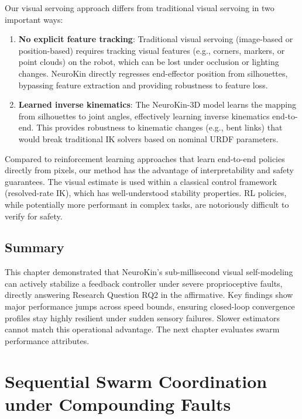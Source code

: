 \documentclass[12pt,a4paper,oneside]{report}
\begin{document}
Our visual servoing approach differs from traditional visual servoing in two important ways:
\begin{enumerate}
    \item \textbf{No explicit feature tracking}: Traditional visual servoing (image-based or position-based) requires tracking visual features (e.g., corners, markers, or point clouds) on the robot, which can be lost under occlusion or lighting changes. NeuroKin directly regresses end-effector position from silhouettes, bypassing feature extraction and providing robustness to feature loss.
    \item \textbf{Learned inverse kinematics}: The NeuroKin-3D model learns the mapping from silhouettes to joint angles, effectively learning inverse kinematics end-to-end. This provides robustness to kinematic changes (e.g., bent links) that would break traditional IK solvers based on nominal URDF parameters.
\end{enumerate}

Compared to reinforcement learning approaches that learn end-to-end policies directly from pixels, our method has the advantage of interpretability and safety guarantees. The visual estimate is used within a classical control framework (resolved-rate IK), which has well-understood stability properties. RL policies, while potentially more performant in complex tasks, are notoriously difficult to verify for safety.

\section{Summary}

This chapter demonstrated that NeuroKin's sub-millisecond visual self-modeling can actively stabilize a feedback controller under severe proprioceptive faults, directly answering Research Question RQ2 in the affirmative. Key findings show major performance jumps across speed bounds, ensuring closed-loop convergence profiles stay highly resilient under sudden sensory failures. Slower estimators cannot match this operational advantage. The next chapter evaluates swarm performance attributes.

\clearpage

\chapter{Sequential Swarm Coordination under Compounding Faults}
\label{chap:sequential_swarm_coordination}
\end{document}
